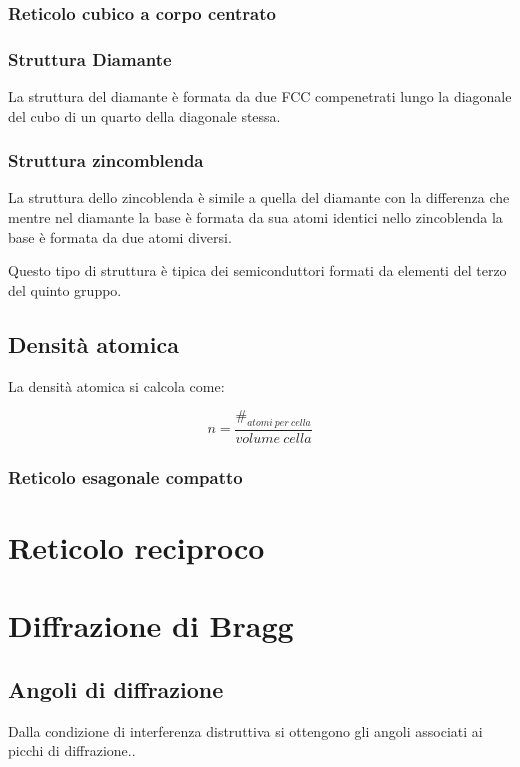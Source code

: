 \documentclass[10pt,a4paper]{report}
\begin{document}
		\subsection{Reticolo cubico a corpo centrato}

	
		\subsection{Struttura Diamante}
				La struttura del diamante è formata da due FCC compenetrati lungo la diagonale del cubo di un quarto della diagonale stessa.
			
		\subsection{Struttura zincomblenda}
				La struttura dello zincoblenda è simile a quella del diamante con la differenza che mentre nel diamante la base è formata da sua atomi identici nello zincoblenda la base è formata da due atomi diversi.

				Questo tipo di struttura è tipica dei semiconduttori formati da elementi del terzo del quinto gruppo.

		\section{Densità atomica}
		La densità atomica si calcola come:

		\[
		n=\frac{\#_{atomi \ per \ cella}}{volume \ cella}
		\]

		\subsection{Reticolo esagonale compatto}



\chapter{Reticolo reciproco}

\chapter{Diffrazione di Bragg}

	\section{Angoli di diffrazione}
	Dalla condizione di interferenza distruttiva si ottengono gli angoli associati ai picchi di diffrazione..
\end{document}
